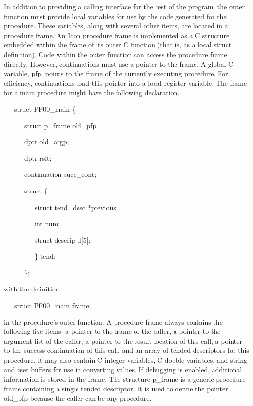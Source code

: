 In addition to providing a calling interface for the rest of the
program, the outer function must provide local variables for use by
the code generated for the procedure. These variables, along with
several other items, are located in a procedure frame. An Icon
procedure frame is implemented as a C structure embedded within the
frame of its outer C function (that is, as a local struct
definition). Code within the outer function can access the procedure
frame directly. However, continuations must use a pointer to the
frame. A global C variable, pfp, points to the frame of the currently
executing procedure. For efficiency, continuations load this pointer
into a local register variable. The frame for a main procedure might
have the following declaration.

{\ttfamily\mdseries
\ \ \ struct PF00\_main \{}

{\ttfamily\mdseries
\ \ \ \ \ \ struct p\_frame old\_pfp;}

{\ttfamily\mdseries
\ \ \ \ \ \ dptr old\_argp;}

{\ttfamily\mdseries
\ \ \ \ \ \ dptr rslt;}

{\ttfamily\mdseries
\ \ \ \ \ \ continuation succ\_cont;}

{\ttfamily\mdseries
\ \ \ \ \ \ struct \{}

{\ttfamily\mdseries
\ \ \ \ \ \ \ \ \ struct tend\_desc *previous;}

{\ttfamily\mdseries
\ \ \ \ \ \ \ \ \ int num;}

{\ttfamily\mdseries
\ \ \ \ \ \ \ \ \ struct descrip d[5];}

{\ttfamily\mdseries
\ \ \ \ \ \ \ \ \ \} tend;}

{\ttfamily\mdseries
\ \ \ \ \ \ \};}

\noindent with the definition

{\ttfamily\mdseries
\ \ \ struct PF00\_main frame;}

\noindent in the procedure's outer function. A procedure frame always
contains the following five items: a pointer to the frame of the
caller, a pointer to the argument list of the caller, a pointer to the
result location of this call, a pointer to the success continuation of
this call, and an array of tended descriptors for this procedure. It
may also contain C integer variables, C double variables, and string
and cset buffers for use in converting values. If debugging is
enabled, additional information is stored in the frame. The structure
p\_frame is a generic procedure frame containing a single tended
descriptor. It is used to define the pointer old\_pfp because the
caller can be any procedure.

